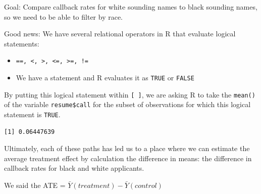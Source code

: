 \documentclass[
  letterpaper,
  DIV=11,
  numbers=noendperiod]{scrreprt}
\newenvironment{Shaded}{\begin{snugshade}}{\end{snugshade}}
\newcommand{\DocumentationTok}[1]{\textcolor[rgb]{0.37,0.37,0.37}{\textit{#1}}}
\newcommand{\FunctionTok}[1]{\textcolor[rgb]{0.28,0.35,0.67}{#1}}
\newcommand{\NormalTok}[1]{\textcolor[rgb]{0.00,0.23,0.31}{#1}}
\newcommand{\OtherTok}[1]{\textcolor[rgb]{0.00,0.23,0.31}{#1}}
\newcommand{\SpecialCharTok}[1]{\textcolor[rgb]{0.37,0.37,0.37}{#1}}
\newcommand{\StringTok}[1]{\textcolor[rgb]{0.13,0.47,0.30}{#1}}
\providecommand{\tightlist}{%
  \setlength{\itemsep}{0pt}\setlength{\parskip}{0pt}}\usepackage{longtable,booktabs,array}
\begin{document}
Goal: Compare callback rates for white sounding names to black sounding
names, so we need to be able to filter by race.

Good news: We have several relational operators in R that evaluate
logical statements:

\begin{itemize}
\tightlist
\item
  \texttt{==,\ \textless{},\ \textgreater{},\ \textless{}=,\ \textgreater{}=,\ !=}
\item
  We have a statement and R evaluates it as \texttt{TRUE} or
  \texttt{FALSE}
\end{itemize}

\begin{Shaded}
\end{Shaded}

By putting this logical statement within \texttt{{[}\ {]}}, we are
asking R to take the \texttt{mean()} of the variable
\texttt{resume\$call} for the subset of observations for which this
logical statement is \texttt{TRUE}.

\begin{Shaded}
\end{Shaded}

\begin{verbatim}
[1] 0.06447639
\end{verbatim}

Ultimately, each of these paths has led us to a place where we can
estimate the average treatment effect by calculation the difference in
means: the difference in callback rates for black and white applicants.

We said the ATE = \(\bar{Y}(treatment) - \bar{Y}(control)\)

\begin{Shaded}
\end{Shaded}
\end{document}
